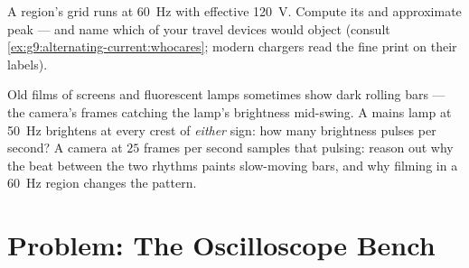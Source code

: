 \begin{exercise}[$\star\star$]\label{exo:g9:alternating-current:11}
A region's grid runs at \qty{60}{Hz} with effective
\qty{120}{V}. Compute its  and approximate peak
 --- and name which of your travel devices would
object (consult
\cref{ex:g9:alternating-current:whocares}; modern chargers
read the fine print on their labels).
\end{exercise}

\begin{exercise}[$\star\star\star$]\label{exo:g9:alternating-current:12}
Old films of screens and fluorescent lamps sometimes show
dark rolling bars --- the camera's frames catching the
lamp's brightness mid-swing. A mains lamp at \qty{50}{Hz}
brightens at every crest of \emph{either} sign: how many
brightness pulses per second? A camera at $25$ frames per
second samples that pulsing: reason out why the beat between
the two rhythms paints slow-moving bars, and why filming in
a \qty{60}{Hz} region changes the pattern.
\end{exercise}

\section{Problem: The Oscilloscope Bench}

